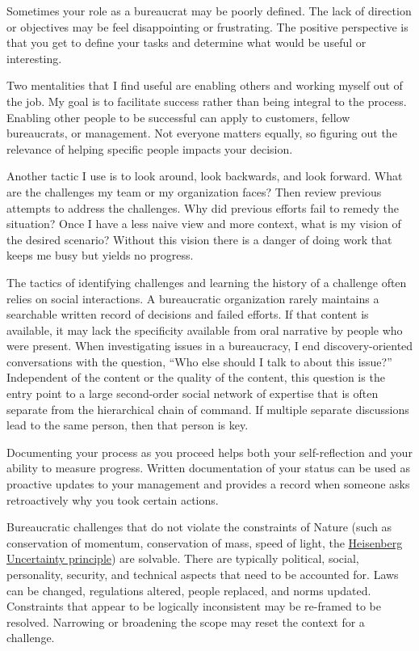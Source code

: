 Sometimes your role as a bureaucrat may be poorly defined. The lack of direction or objectives may be feel disappointing or frustrating. The positive perspective is that you get to define your tasks and determine what would be useful or interesting. 

Two mentalities that I find useful are enabling others and working myself out of the job. My goal is to facilitate success rather than being integral to the process. Enabling other people to be successful can apply to customers, fellow bureaucrats, or management. Not everyone matters equally, so figuring out the relevance of helping specific people impacts your decision. 

Another tactic I use is to look around, look backwards, and look forward. What are the challenges my team or my organization faces? Then review previous attempts to address the challenges. Why did previous efforts fail to remedy the situation? Once I have a less naive view and more context, what is my vision of the desired scenario? Without this vision there is a danger of doing work that keeps me busy but yields no progress. 

The tactics of identifying challenges and learning the history of a challenge often relies on social interactions. A bureaucratic organization rarely maintains a searchable written record of decisions and failed efforts. If that content is available, it may lack the specificity available from oral narrative by people who were present. When investigating issues in a bureaucracy, I end discovery-oriented conversations with the question, ``Who else should I talk to about this issue?'' Independent of the content or the quality of the content, this question is the entry point to a large second-order social network of expertise that is often separate from the hierarchical chain of command. If multiple separate discussions lead to the same person, then that person is key. 

Documenting your process as you proceed helps both your self-reflection and your ability to measure progress. Written documentation of your status can be used as proactive updates to your management and provides a record when someone asks retroactively why you took certain actions.

Bureaucratic challenges that do not violate the constraints of Nature (such as conservation of momentum, conservation of mass, speed of light, the \href{https://en.wikipedia.org/wiki/Uncertainty_principle}{Heisenberg Uncertainty principle}) 
are solvable. There are typically political, social, personality, security, and technical aspects that need to be accounted for. Laws can be changed, regulations altered, people replaced, and norms updated. Constraints that appear to be logically inconsistent may be re-framed to be resolved. Narrowing or broadening the scope may reset the context for a challenge.



